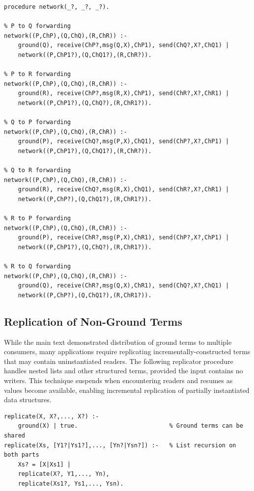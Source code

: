 \label{program:3-way-network-switch}
\begin{verbatim}
procedure network(_?, _?, _?).

% P to Q forwarding
network((P,ChP),(Q,ChQ),(R,ChR)) :-
    ground(Q), receive(ChP?,msg(Q,X),ChP1), send(ChQ?,X?,ChQ1) |
    network((P,ChP1?),(Q,ChQ1?),(R,ChR?)).

% P to R forwarding  
network((P,ChP),(Q,ChQ),(R,ChR)) :-
    ground(R), receive(ChP?,msg(R,X),ChP1), send(ChR?,X?,ChR1) |
    network((P,ChP1?),(Q,ChQ?),(R,ChR1?)).

% Q to P forwarding
network((P,ChP),(Q,ChQ),(R,ChR)) :-
    ground(P), receive(ChQ?,msg(P,X),ChQ1), send(ChP?,X?,ChP1) |
    network((P,ChP1?),(Q,ChQ1?),(R,ChR?)).

% Q to R forwarding
network((P,ChP),(Q,ChQ),(R,ChR)) :-
    ground(R), receive(ChQ?,msg(R,X),ChQ1), send(ChR?,X?,ChR1) |
    network((P,ChP?),(Q,ChQ1?),(R,ChR1?)).

% R to P forwarding
network((P,ChP),(Q,ChQ),(R,ChR)) :-
    ground(P), receive(ChR?,msg(P,X),ChR1), send(ChP?,X?,ChP1) |
    network((P,ChP1?),(Q,ChQ?),(R,ChR1?)).

% R to Q forwarding
network((P,ChP),(Q,ChQ),(R,ChR)) :-
    ground(Q), receive(ChR?,msg(Q,X),ChR1), send(ChQ?,X?,ChQ1) |
    network((P,ChP?),(Q,ChQ1?),(R,ChR1?)).
\end{verbatim}

\subsection{Replication of Non-Ground Terms}

While the main text demonstrated distribution of ground terms to multiple consumers, many applications require replicating incrementally-constructed terms that may contain uninstantiated readers. The following replicator procedure handles nested lists and other structured terms, provided the input contains no writers. This technique suspends when encountering readers and resumes as values become available, enabling incremental replication of partially instantiated data structures.

\label{program:replicator}
\begin{verbatim}
replicate(X, X?,..., X?) :- 
    ground(X) | true.                          % Ground terms can be shared
replicate(Xs, [Y1?|Ys1?],..., [Yn?|Ysn?]) :-   % List recursion on both parts
    Xs? = [X|Xs1] |
    replicate(X?, Y1,..., Yn),
    replicate(Xs1?, Ys1,..., Ysn).
\end{verbatim}

